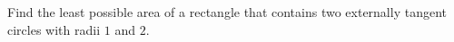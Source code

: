 Find the least possible area of a rectangle that contains two externally tangent circles with radii $1$ and $2$.

